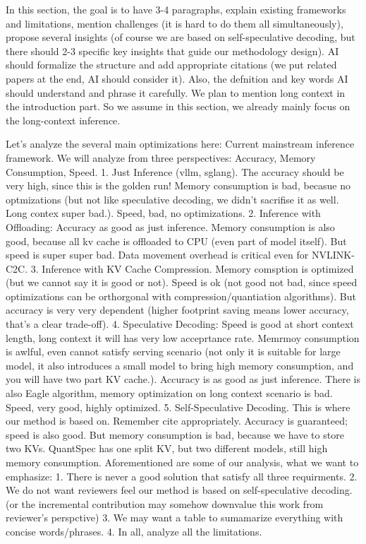 
In this section, the goal is to have 3-4 paragraphs, explain existing frameworks and limitations, mention challenges (it is hard to do them all simultaneously), propose several insights (of course we are based on self-speculative decoding, but there should 2-3 specific key insights that guide our methodology design).
AI should formalize the structure and add appropriate citations (we put related papers at the end, AI should consider it). Also, the defnition and key words AI should understand and phrase it carefully.
We plan to mention long context in the introduction part. So we assume in this section, we already mainly focus on the long-context inference.

Let's analyze the several main optimizations here:
Current mainstream inference framework. We will analyze from three perspectives: Accuracy, Memory Consumption, Speed.
1. Just Inference (vllm, sglang). The accuracy should be very high, since this is the golden run! Memory consumption is bad, becasue no optmizations (but not like speculative decoding, we didn't sacrifise it as well. Long contex super bad.). Speed, bad, no optimizations.
2. Inference with Offloading: Accuracy as good as just inference. Memory consumption is also good, because all kv cache is offloaded to CPU (even part of model itself). \cite{zhang2023h2o} But speed is super super bad. Data movement overhead is critical even for NVLINK-C2C.
3. Inference with KV Cache Compression. Memory comsption is optimized (but we cannot say it is good or not). Speed is ok (not good not bad, since speed optimizations can be orthorgonal with compression/quantiation algorithms). But accuracy is very very dependent (higher footprint saving means lower accuracy, that's a clear trade-off).
4. Speculative Decoding: Speed is good at short context length, long context it will has very low acceprtance rate. Memrmoy consumption is awlful, even cannot satisfy serving scenario (not only it is suitable for large model, it also introduces a small model to bring high memory consumption, and you will have two part KV cache.). Accuracy is as good as just inference. There is also Eagle algorithm, memory optimization on long context scenario is bad. Speed, very good, highly optimized.
5. Self-Speculative Decoding. This is where our method is based on. Remember cite appropriately. Accuracy is guaranteed; speed is also good. But memory consumption is bad, because we have to store two KVs. QuantSpec has one split KV, but two different models, still high memory consumption.
Aforementioned are some of our analysis, what we want to emphasize:
1. There is never a good solution that satisfy all three requirments.
2. We do not want reviewers feel our method is based on self-speculative decoding. (or the incremental contribution may somehow downvalue this work from reviewer's perspctive)
3. We may want a table to sumamarize everything with concise words/phrases.
4. In all, analyze all the limitations.


